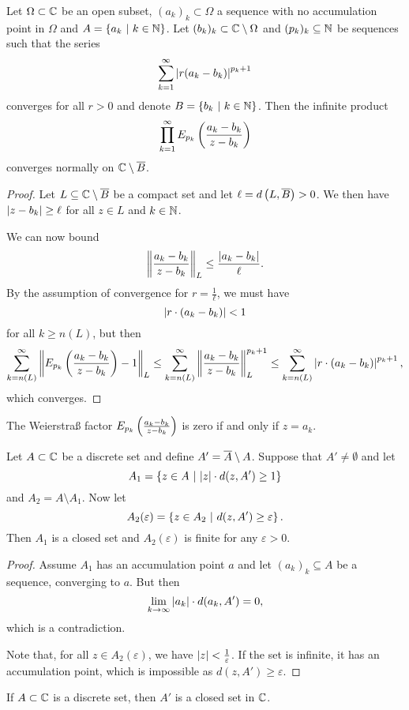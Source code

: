 \obvs

\begin{lema}
Let $\Omega \subset \mathbb{C}$ be an open subset, $(a_k)_k \subset \Omega$
a sequence with no accumulation point in $\Omega$ and
$A = \left\{a_k~\middle\vert~k \in \mathbb{N}\right\}$. Let
$(b_k)_k \subset \mathbb{C} \setminus \Omega$ and $(p_k)_k \subseteq \mathbb{N}$ be
sequences such that the series
\[
\sum_{k=1}^\infty \left\lvert r (a_k - b_k)\right\rvert^{p_k+1}
\]
converges for all $r > 0$ and denote $B = \left\{b_k~\middle\vert~k \in \mathbb{N}\right\}$.
Then the infinite product
\[
\prod_{k=1}^\infty E_{p_k} \left(\frac{a_k - b_k}{z - b_k}\right)
\]
converges normally on $\mathbb{C} \setminus \overline{B}$.
\end{lema}

\begin{proof}
Let $L \subseteq \mathbb{C} \setminus \overline{B}$ be a compact set and let
$\ell = d\left(L, \overline{B}\right) > 0$. We then have
$\left\lvert z - b_k\right\rvert \geq \ell$ for all $z \in L$ and $k \in \mathbb{N}$.

We can now bound
\[
\left\lVert \frac{a_k - b_k}{z - b_k}\right\rVert_L \leq
\frac{\left\lvert a_k - b_k\right\rvert}{\ell}.
\]
By the assumption of convergence for $r = \frac{1}{\ell}$, we must
have
\[
\left\lvert r \cdot (a_k - b_k)\right\rvert < 1
\]
for all $k \geq n(L)$, but then
\[
\sum_{k=n(L)}^\infty
\left\lVert E_{p_k} \left(\frac{a_k - b_k}{z - b_k}\right) - 1\right\rVert_L \leq
\sum_{k=n(L)}^\infty 
\left\lVert \frac{a_k - b_k}{z - b_k}\right\rVert_L^{p_k+1}\leq
\sum_{k=n(L)}^\infty \left\lvert r \cdot \left(a_k - b_k\right)\right\rvert^{p_k+1},
\]
which converges.
\end{proof}

\begin{opomba}
The Weierstraß factor $E_{p_k} \left(\frac{a_k - b_k}{z - b_k}\right)$ is
zero if and only if $z = a_k$.
\end{opomba}

\begin{lema}
Let $A \subset \mathbb{C}$ be a discrete set and define
$A' = \overline{A} \setminus A$. Suppose that $A' \ne \emptyset$ and
let
\[
A_1 = \left\{z \in A~\middle\vert~\left\lvert z\right\rvert \cdot d(z, A') \geq 1\right\}
\]
and $A_2 = A \setminus A_1$. Now let
\[
A_2(\varepsilon) = \left\{z \in A_2~\middle\vert~d(z, A') \geq \varepsilon\right\}.
\]
Then $A_1$ is a closed set and $A_2(\varepsilon)$ is finite for any
$\varepsilon > 0$.
\end{lema}

\begin{proof}
Assume $A_1$ has an accumulation point $a$ and let
$(a_k)_k \subseteq A$ be a sequence, converging to $a$. But then
\[
\lim_{k \to \infty} \left\lvert a_k\right\rvert \cdot d(a_k, A') = 0,
\]
which is a contradiction.

Note that, for all $z \in A_2(\varepsilon)$, we have
$\left\lvert z\right\rvert < \frac{1}{\varepsilon}$. If the set is infinite, it has
an accumulation point, which is impossible as
$d(z, A') \geq \varepsilon$.
\end{proof}

\begin{opomba}
If $A \subset \mathbb{C}$ is a discrete set, then $A'$ is a closed set in
$\mathbb{C}$.
\end{opomba}


